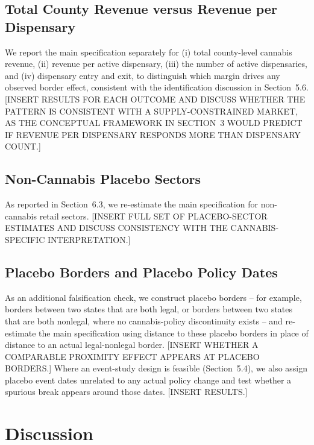 \documentclass[12pt]{article}
\begin{document}
\subsection{Total County Revenue versus Revenue per Dispensary}
We report the main specification separately for (i) total county-level cannabis revenue, (ii) revenue per
active dispensary, (iii) the number of active dispensaries, and (iv) dispensary entry and exit, to
distinguish which margin drives any observed border effect, consistent with the identification discussion
in Section~5.6. [INSERT RESULTS FOR EACH OUTCOME AND DISCUSS WHETHER THE PATTERN IS CONSISTENT WITH A
SUPPLY-CONSTRAINED MARKET, AS THE CONCEPTUAL FRAMEWORK IN SECTION~3 WOULD PREDICT IF REVENUE PER DISPENSARY
RESPONDS MORE THAN DISPENSARY COUNT.]

\subsection{Non-Cannabis Placebo Sectors}
As reported in Section~6.3, we re-estimate the main specification for non-cannabis retail sectors. [INSERT
FULL SET OF PLACEBO-SECTOR ESTIMATES AND DISCUSS CONSISTENCY WITH THE CANNABIS-SPECIFIC INTERPRETATION.]

\subsection{Placebo Borders and Placebo Policy Dates}
As an additional falsification check, we construct placebo borders -- for example, borders between two
states that are both legal, or borders between two states that are both nonlegal, where no cannabis-policy
discontinuity exists -- and re-estimate the main specification using distance to these placebo borders in
place of distance to an actual legal-nonlegal border. [INSERT WHETHER A COMPARABLE PROXIMITY EFFECT APPEARS
AT PLACEBO BORDERS.] Where an event-study design is feasible (Section~5.4), we also assign placebo event
dates unrelated to any actual policy change and test whether a spurious break appears around those dates.
[INSERT RESULTS.]

\section{Discussion}
\label{sec:discussion}
\end{document}
